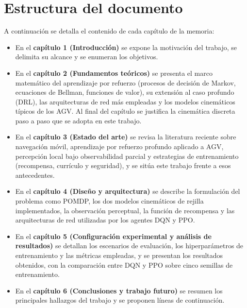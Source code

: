 \section{Estructura del documento}\label{sec:estructura_documento}
A continuación se detalla el contenido de cada capítulo de la memoria:
\begin{itemize}
    \item En el \textbf{capítulo 1 (Introducción)} se expone la motivación del
    trabajo, se delimita su alcance y se enumeran los objetivos.
    \item En el \textbf{capítulo 2 (Fundamentos teóricos)} se presenta el marco
    matemático del aprendizaje por refuerzo (procesos de decisión de Markov,
    ecuaciones de Bellman, funciones de valor), su extensión al caso profundo
    (DRL), las arquitecturas de red más empleadas y los modelos cinemáticos
    típicos de los AGV. Al final del capítulo se justifica la cinemática
    discreta paso a paso que se adopta en este trabajo.
    \item En el \textbf{capítulo 3 (Estado del arte)} se revisa la literatura
    reciente sobre navegación móvil, aprendizaje por refuerzo profundo
    aplicado a AGV, percepción local bajo observabilidad parcial y
    estrategias de entrenamiento (recompensa, currículo y seguridad), y se
    sitúa este trabajo frente a esos antecedentes.
    \item En el \textbf{capítulo 4 (Diseño y arquitectura)} se describe la
    formulación del problema como POMDP, los dos modelos cinemáticos de
    rejilla implementados, la observación perceptual, la función de
    recompensa y las arquitecturas de red utilizadas por los agentes DQN y
    PPO.
    \item En el \textbf{capítulo 5 (Configuración experimental y análisis de
    resultados)} se detallan los escenarios de evaluación, los
    hiperparámetros de entrenamiento y las métricas empleadas, y se
    presentan los resultados obtenidos, con la comparación entre DQN y PPO
    sobre cinco semillas de entrenamiento.
    \item En el \textbf{capítulo 6 (Conclusiones y trabajo futuro)} se
    resumen los principales hallazgos del trabajo y se proponen líneas de
    continuación.
\end{itemize}
